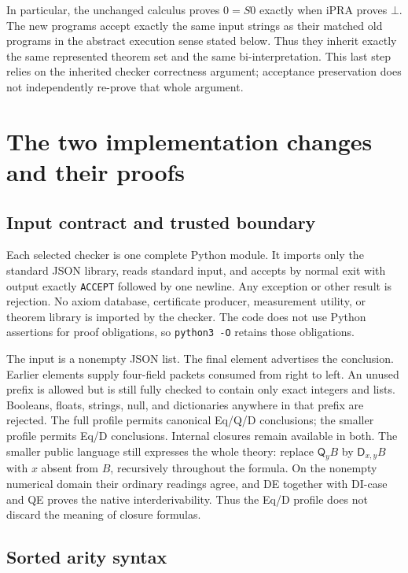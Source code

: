 \documentclass[11pt]{article}
\theoremstyle{definition}\newtheorem{definition}[theorem]{Definition}
\theoremstyle{remark}\newtheorem{remark}[theorem]{Remark}
\newcommand{\Q}{\mathsf Q}
\newcommand{\D}{\mathsf D}
\begin{document}
In particular, the unchanged calculus proves $0=S0$ exactly when iPRA
proves $\bot$. The new programs accept exactly the same input strings as
their matched old programs in the abstract execution sense stated below.
Thus they inherit exactly the same represented theorem set and the same
bi-interpretation. This last step relies on the inherited checker
correctness argument; acceptance preservation does not independently
re-prove that whole argument.

\section{The two implementation changes and their proofs}
\label{sec:preservation}

\subsection{Input contract and trusted boundary}

Each selected checker is one complete Python module. It imports only the
standard JSON library, reads standard input, and accepts by normal exit
with output exactly \texttt{ACCEPT} followed by one newline. Any exception
or other result is rejection. No axiom database, certificate producer,
measurement utility, or theorem library is imported by the checker.
The code does not use Python assertions for proof obligations, so
\texttt{python3 -O} retains those obligations.

The input is a nonempty JSON list. The final element advertises the
conclusion. Earlier elements supply four-field packets consumed from
right to left. An unused prefix is allowed but is still fully checked to
contain only exact integers and lists. Booleans, floats, strings,
null, and dictionaries anywhere in that prefix are rejected. The full
profile permits canonical Eq/Q/D conclusions; the smaller profile
permits Eq/D conclusions. Internal closures remain available in both.
The smaller public language still expresses the whole theory: replace
$\Q_yB$ by $\D_{x,y}B$ with $x$ absent from $B$, recursively throughout
the formula. On the nonempty numerical domain their ordinary readings
agree, and DE together with DI-case and QE proves the native
interderivability. Thus the Eq/D profile does not discard the meaning
of closure formulas.

\subsection{Sorted arity syntax}
\end{document}
